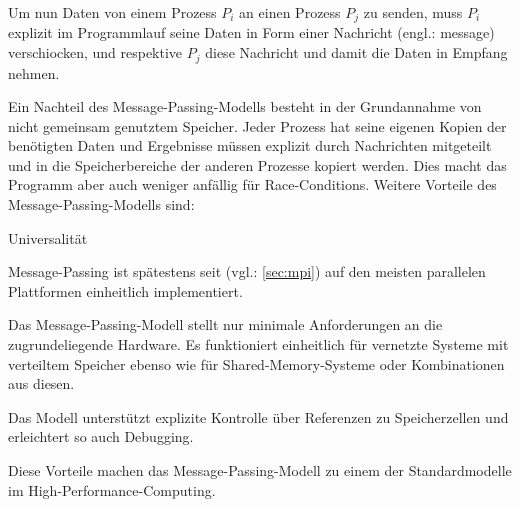       Um nun Daten von einem Prozess $P_i$ an einen Prozess $P_j$ zu senden, muss $P_i$ explizit im Programmlauf seine Daten in Form einer Nachricht (engl.: message) verschiocken, und
      respektive $P_j$ diese Nachricht und damit die Daten in Empfang nehmen. 
      
      Ein Nachteil des Message-Passing-Modells besteht in der Grundannahme von nicht gemeinsam genutztem Speicher.
      Jeder Prozess hat seine eigenen Kopien der benötigten Daten und Ergebnisse müssen explizit durch Nachrichten mitgeteilt und in die Speicherbereiche der anderen Prozesse kopiert werden. Dies
      macht das Programm aber auch weniger anfällig für Race-Conditions. Weitere Vorteile des Message-Passing-Modells sind:
      \begin{labeling}{Universalität }
	\item[Portabilität] Message-Passing ist spätestens seit  (vgl.: \autoref{sec:mpi}) auf den meisten parallelen Plattformen einheitlich implementiert.
	\item[Universalität] Das Message-Passing-Modell stellt nur minimale Anforderungen an die zugrundeliegende Hardware. Es funktioniert einheitlich für vernetzte Systeme mit verteiltem 
			     Speicher ebenso wie für Shared-Memory-Systeme oder Kombinationen aus diesen.
	\item[Einfachheit] Das Modell unterstützt explizite Kontrolle über Referenzen zu Speicherzellen und erleichtert so auch Debugging.
      \end{labeling}
      Diese Vorteile machen das Message-Passing-Modell zu einem der Standardmodelle im High-Performance-Computing. \citep{ibm_mpm, anl_mpm, fsu_mpm}
    